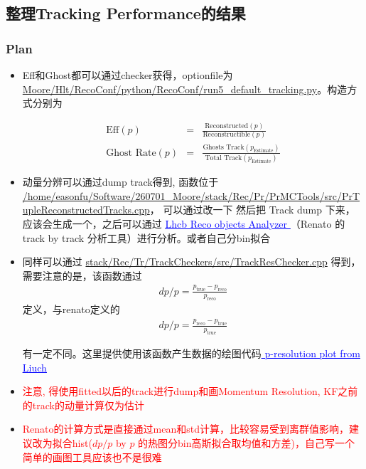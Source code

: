 \documentclass[UTF8]{article}
\newcommand{\red}[1]{\textcolor{red}{#1}}
\newcommand{\link}[2]{\href{#1}{\textcolor{blue}{\underline{#2}}}}
\begin{document}
\subsection{整理Tracking Performance的结果}
\subsubsection{Plan}
\begin{itemize}
  \item Eff和Ghost都可以通过checker获得，optionfile为\url{Moore/Hlt/RecoConf/python/RecoConf/run5_default_tracking.py}。构造方式分别为

\begin{eqnarray}
    \text{Eff}(p) &=& \frac{\text{Reconstructed}(p)}{\text{Reconstructible}(p)}\\
    \text{Ghost Rate}(p) &=& \frac{\text{Ghosts Track}(p_{\text{Estimate}})}{\text{Total Track}(p_{\text{Estimate}})}
\end{eqnarray}

  \item 动量分辨可以通过dump track得到, 函数位于 \url{/home/easonfu/Software/260701_Moore/stack/Rec/Pr/PrMCTools/src/PrTupleReconstructedTracks.cpp}， 可以通过改一下  然后把 Track dump 下来，应该会生成一个，之后可以通过 \link{https://github.com/qgl90/lhcb_recoobjects_analyzer/tree/main}{ Lhcb Reco objects Analyzer }（Renato 的 track by track 分析工具）进行分析。或者自己分bin拟合

  \item 同样可以通过 \url{stack/Rec/Tr/TrackCheckers/src/TrackResChecker.cpp} 得到，需要注意的是，该函数通过
  \begin{eqnarray}
      dp/p = \frac{p_{\text{true}} - p_{\text{reco}}}{p_{\text{reco}}}
  \end{eqnarray}
  定义，与renato定义的
  \begin{eqnarray}
      dp/p = \frac{p_{\text{reco}} - p_{\text{true}}}{p_{\text{true}}}
  \end{eqnarray}
  
  有一定不同。这里提供使用该函数产生数据的绘图代码\link{https://gitlab.cern.ch/liuch/tracking-draw}{ p-resolution plot from Liuch }
  
  \item \red{注意, 得使用fitted以后的track进行dump和画Momentum Resolution, KF之前的track的动量计算仅为估计}
  \item \red{Renato的计算方式是直接通过mean和std计算，比较容易受到离群值影响，建议改为拟合hist($dp/p$ by $p$ 的热图分bin高斯拟合取均值和方差)，自己写一个简单的画图工具应该也不是很难}
\end{itemize}
\end{document}

